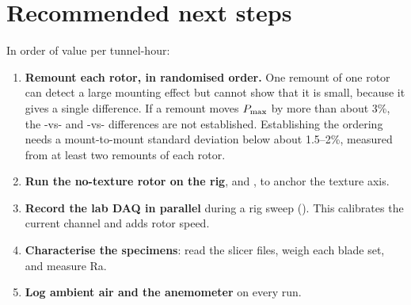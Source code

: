 \documentclass[11pt]{article}
\begin{document}
\section{Recommended next steps}\label{sec:next}
In order of value per tunnel-hour:
\begin{enumerate}
  \item \textbf{Remount each rotor, in randomised order.} One remount of one rotor can detect a
        large mounting effect but cannot show that it is small, because it gives a single
        difference. If a remount moves $P_{\max}$ by more than about 3\%, the -vs-
        and -vs- differences are not established. Establishing the ordering
        needs a mount-to-mount standard deviation below about 1.5–2\%, measured from at least
        two remounts of each rotor.
  \item \textbf{Run the no-texture rotor on the rig}\ifHaveRaTen\else, and \fi, to anchor
        the texture axis.
  \item \textbf{Record the lab DAQ in parallel} during a rig sweep (). This
        calibrates the current channel and adds rotor speed.
  \item \textbf{Characterise the specimens}: read the slicer files, weigh each blade set, and
        measure Ra.
  \item \textbf{Log ambient air and the anemometer} on every run.
\end{enumerate}
\end{document}
